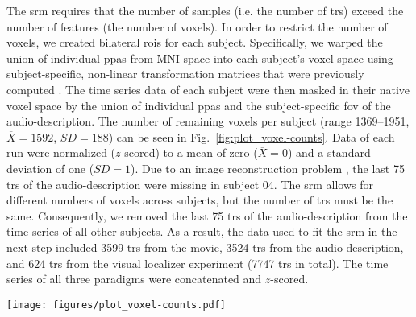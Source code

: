 
The \ac{srm} requires that the number of samples (i.e. the number of \acp{tr})
exceed the number of features (the number of voxels).
%
In order to restrict the number of voxels, we created bilateral \acp{roi} for
each subject.
%
Specifically, we warped the union of individual \acp{ppa}
\citep[s.][]{haeusler2022processing} from MNI space into each subject's voxel
space using subject-specific, non-linear transformation matrices that were
previously computed
\citep[][\href{https://github.com/psychoinformatics-de/studyforrest-data-templatetransforms
}{\url{github.com/psychoinformatics-de/studyforrest-data-templatetransforms}}]{hanke2014audiomovie}.
The time series data of each subject were then masked in their native voxel
space by the union of individual \acp{ppa} and the subject-specific \ac{fov} of
the audio-description.
The number of remaining voxels per subject (range 1369--1951,
$\overline{X}=1592$, $SD=188$) can be seen in Fig.~\ref{fig:plot_voxel-counts}.
Data of each run were normalized ($z$-scored) to a mean of zero
($\overline{X}=0$) and a standard deviation of one ($SD=1$).
%
Due to an image reconstruction problem \citep[cf.][]{hanke2014audiomovie}, the
last 75 \acp{tr} of the audio-description were missing in subject 04.
%
The \ac{srm} allows for different numbers of voxels across subjects, but the
number of \acp{tr} must be the same.
%
Consequently, we removed the last 75 \acp{tr} of the audio-description from the
time series of all other subjects.
As a result, the data used to fit the \ac{srm} in the next step included 3599
\acp{tr} from the movie, 3524 \acp{tr} from the audio-description, and 624
\acp{tr} from the visual localizer experiment (7747 \acp{tr} in total).
The time series of all three paradigms were concatenated and $z$-scored.

\begin{figure*}[tbp]
\centering
\texttt{[image: figures/plot\_voxel-counts.pdf]}
\caption{
%
\textbf{Number of voxels in the bilateral regions of interest (ROIs)
of each subject.}
%
In order to reduce the number of voxels, we warped the union of
individual \acp{ppa} \citep[cf. Fig. 1 in][]{haeusler2022processing} from
MNI152 space into each subject's native voxel space.
%
The remaining voxels of each subject were further constrained to those
voxels that are included in the respective subject's \ac{fov} of the
audio-description \citep[cf.][]{hanke2014audiomovie}.
}
\label{fig:plot_voxel-counts}
\end{figure*}


